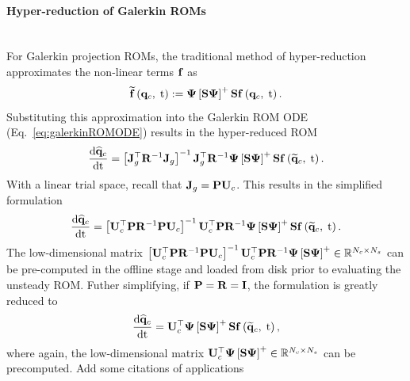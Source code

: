 \paragraph*{Hyper-reduction of Galerkin ROMs}\mbox{}\\
%
For Galerkin projection ROMs, the traditional method of hyper-reduction approximates the non-linear terms $\mathbf{f}$ as
%
\begin{equation}
	\rhsApproxFunc{\consVec, \; \timeVar} \defEq \deimBasis \left[ \sampMat \deimBasis \right]^+ \sampMat \rhsFunc{\consVec, \; \timeVar}.
\end{equation}
%
Substituting this approximation into the Galerkin ROM ODE (Eq.~\ref{eq:galerkinROMODE}) results in the hyper-reduced ROM
%
\begin{equation}\label{eq:galerkinROMHR}
    \ode{\consVecCoef}{\timeVar} = \left[\jacobDecode^\top \resScaleInv \jacobDecode\right]^{-1} \jacobDecode^\top \resScaleInv \deimBasis \left[ \sampMat \deimBasis \right]^+ \sampMat \rhsFunc{\consVecRom, \; \timeVar}.
\end{equation}
%
With a linear trial space, recall that $\jacobDecode = \consScale \consTrial$. This results in the simplified formulation
%
\begin{equation}
    \ode{\consVecCoef}{\timeVar} = \left[\consTrial^\top \consScale \resScaleInv \consScale \consTrial\right]^{-1} \consTrial^\top \consScale \resScaleInv \deimBasis \left[ \sampMat \deimBasis \right]^+ \sampMat \rhsFunc{\consVecRom, \; \timeVar}.
\end{equation}
%
The low-dimensional matrix $\left[\consTrial^\top \consScale \resScaleInv \consScale \consTrial\right]^{-1} \consTrial^\top \consScale \resScaleInv \deimBasis \left[ \sampMat \deimBasis \right]^+ \inRTwo{\numConsModes}{\numSamps}$ can be pre-computed in the offline stage and loaded from disk prior to evaluating the unsteady ROM. Futher simplifying, if $\consScale = \resScale = \identMat$, the formulation is greatly reduced to
%
\begin{equation}
    \ode{\consVecCoef}{\timeVar} = \consTrial^\top \deimBasis \left[ \sampMat \deimBasis \right]^+ \sampMat \rhsFunc{\consVecRom, \; \timeVar},
\end{equation}
%
where again, the low-dimensional matrix $\consTrial^\top \deimBasis \left[ \sampMat \deimBasis \right]^+ \inRTwo{\numConsModes}{\numSamps}$ can be precomputed. {\color{red}Add some citations of applications}

